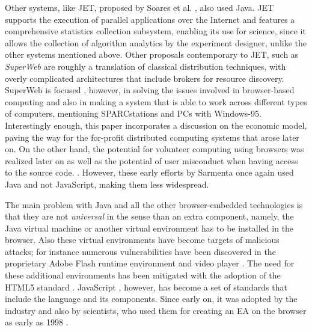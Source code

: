 \documentclass[journal,onecolumn]{IEEEtran}
\begin{document}
Other systems, like JET, proposed by Soares et
al. \cite{soares1998get}, also used Java. JET supports
the execution of parallel applications over the Internet and features
a comprehensive statistics collection subsystem, enabling its use for science, %
since it allows %
the collection of algorithm analytics by the
experiment designer, unlike the other systems mentioned
above. Other proposals contemporary to JET, such as {\em SuperWeb}
\cite{alexandrov1997superweb} are roughly a translation of classical
distribution techniques, with overly complicated architectures that include
brokers for resource discovery. SuperWeb is focused
, however, in solving the
issues involved in browser-based computing and also in making a system
that is able to work across different types of computers, mentioning
SPARCstations and PCs with Windows-95. Interestingly enough, this
paper incorporates a discussion on the economic model, paving the way
for the for-profit distributed computing systems that arose later on. 
On the other hand, the potential for volunteer computing using
browsers was realized
later on \cite{sarmenta-bayanihan} as well as the potential of
user misconduct when having access to the source code.
\cite{sarmenta-sabotagetolerance}. However, these early efforts by
Sarmenta once again used Java and not JavaScript, making them %
less widespread.

The main problem with Java and all the other browser-embedded
technologies is that they are not {\em universal} in the
sense than an extra component, namely, the Java virtual machine or another
virtual environment has to be installed in the browser.
Also these virtual environments have become targets of malicious attacks; 
for instance numerous vulnerabilities have been discovered in 
the proprietary Adobe Flash runtime environment and
video player \cite{ford2009analyzing,watanabe2010new}. The need for
these additional environments has been mitigated with the
adoption of the HTML5 standard \cite{anthes2012html5}.
JavaScript \cite{flanagan2006javascript}, however, has become a set of standards
\cite{ECMA-262} that include the language and its components. Since
early on, it was adopted by the industry and also by scientists,
who used them for creating an EA on
the browser as early as 1998 \cite{jj-ppsn98}.
\end{document}
